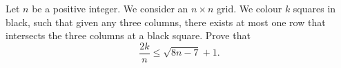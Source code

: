 Let $n$ be a positive integer. We consider an $n\times n$ grid.
We colour $k$ squares in black, such that given any three columns,
there exists at most one row that intersects the three columns at a black square.
Prove that
$$\frac{2k}{n} \leq \sqrt{8n-7}+1.$$
